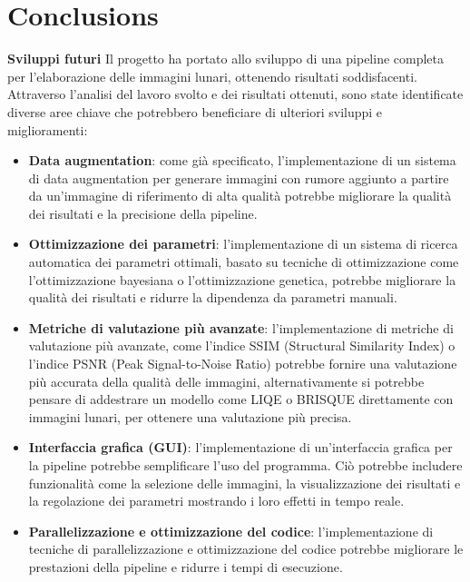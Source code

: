 \chapter*{Conclusions}


\textbf{Sviluppi futuri}
Il progetto ha portato allo sviluppo di una pipeline completa per l'elaborazione delle immagini lunari, ottenendo risultati soddisfacenti. Attraverso l'analisi del lavoro svolto e dei risultati ottenuti, sono state identificate diverse aree chiave che potrebbero beneficiare di ulteriori sviluppi e miglioramenti:

\begin{itemize}
    \item \textbf{Data augmentation}: come già specificato, l'implementazione di un sistema di data augmentation per generare immagini con rumore aggiunto a partire da un'immagine di riferimento di alta qualità potrebbe migliorare la qualità dei risultati e la precisione della pipeline.
    
    \item \textbf{Ottimizzazione dei parametri}: l'implementazione di un sistema di ricerca automatica dei parametri ottimali, basato su tecniche di ottimizzazione come l'ottimizzazione bayesiana o l'ottimizzazione genetica, potrebbe migliorare la qualità dei risultati e ridurre la dipendenza da parametri manuali.
    
    \item \textbf{Metriche di valutazione più avanzate}: l'implementazione di metriche di valutazione più avanzate, come l'indice SSIM (Structural Similarity Index) o l'indice PSNR (Peak Signal-to-Noise Ratio) potrebbe fornire una valutazione più accurata della qualità delle immagini, alternativamente si potrebbe pensare di addestrare un modello come LIQE o BRISQUE direttamente con immagini lunari, per ottenere una valutazione più precisa.
    
    \item \textbf{Interfaccia grafica (GUI)}: l'implementazione di un'interfaccia grafica per la pipeline potrebbe semplificare l'uso del programma. Ciò potrebbe includere funzionalità come la selezione delle immagini, la visualizzazione dei risultati e la regolazione dei parametri mostrando i loro effetti in tempo reale.
    
    \item \textbf{Parallelizzazione e ottimizzazione del codice}: l'implementazione di tecniche di parallelizzazione e ottimizzazione del codice potrebbe migliorare le prestazioni della pipeline e ridurre i tempi di esecuzione.
\end{itemize}

